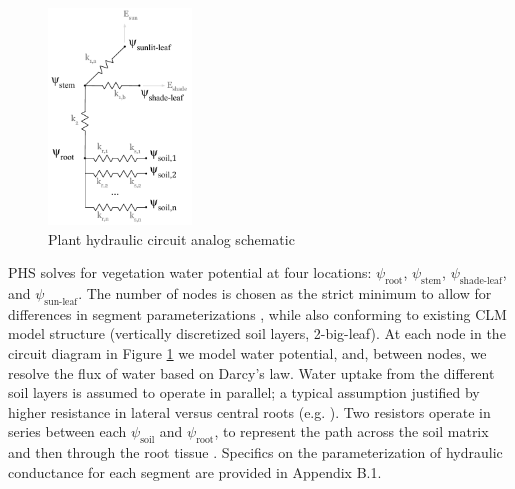 \documentclass[draft,linenumbers]{agujournal}
\begin{document}
  \begin{figure}[h]
     \centering
     \includegraphics[width=9pc]{../figs/circuit.pdf}
     \caption{Plant hydraulic circuit analog schematic}
     \label{circuit}
  \end{figure}


  PHS solves for vegetation water potential at four locations: $\psi_{\text{root}}$, $\psi_{\text{stem}}$, $\psi_{\text{shade-leaf}}$, and $\psi_{\text{sun-leaf}}$.
  The number of nodes is chosen as the strict minimum to allow for differences in segment parameterizations \citep{simonin2015, sperry2015}, while also conforming to existing CLM model structure (vertically discretized soil layers, 2-big-leaf).
  At each node in the circuit diagram in Figure \ref{circuit} we model water potential, and, between nodes, we resolve the flux of water based on Darcy's law. 
  Water uptake from the different soil layers is assumed to operate in parallel; a typical assumption justified by higher resistance in lateral versus central roots (e.g. \cite{williams2001}). 
  Two resistors operate in series between each $\psi_{\text{soil}}$ and $\psi_{\text{root}}$, to represent the path across the soil matrix and then through the root tissue \citep{williams1996}. 
  Specifics on the parameterization of hydraulic conductance for each segment are provided in Appendix B.1.
\end{document}
